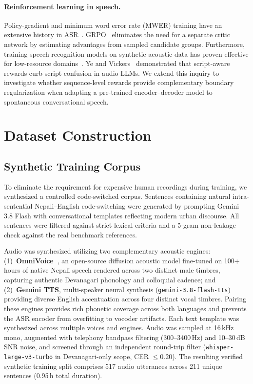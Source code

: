 \documentclass[10pt,twocolumn,a4paper]{article}
\begin{document}
\paragraph{Reinforcement learning in speech.}
Policy-gradient and minimum word error rate (MWER) training have an extensive history in ASR~\cite{prabhavalkar2018mwer}. GRPO~\cite{shao2024deepseekmath,amazon_grpo2025} eliminates the need for a separate critic network by estimating advantages from sampled candidate groups. Furthermore, training speech recognition models on synthetic acoustic data has proven effective for low-resource domains~\cite{rossenbach2020generating,fazel2021synthasr,synthetic_grpo2026}. Ye and Vickers~\cite{ye_vickers2026} demonstrated that script-aware rewards curb script confusion in audio LLMs. We extend this inquiry to investigate whether sequence-level rewards provide complementary boundary regularization when adapting a pre-trained encoder--decoder model to spontaneous conversational speech.

\section{Dataset Construction}

\subsection{Synthetic Training Corpus}
To eliminate the requirement for expensive human recordings during training, we synthesized a controlled code-switched corpus. Sentences containing natural intra-sentential Nepali--English code-switching were generated by prompting Gemini 3.8 Flash with conversational templates reflecting modern urban discourse. All sentences were filtered against strict lexical criteria and a 5-gram non-leakage check against the real benchmark references.

Audio was synthesized utilizing two complementary acoustic engines: (1)~\textbf{OmniVoice~\cite{zhu2026omnivoice}}, an open-source diffusion acoustic model fine-tuned on 100+ hours of native Nepali speech rendered across two distinct male timbres, capturing authentic Devanagari phonology and colloquial cadence; and (2)~\textbf{Gemini TTS}, multi-speaker neural synthesis (\texttt{gemini-3.8-flash-tts}) providing diverse English accentuation across four distinct vocal timbres. Pairing these engines provides rich phonetic coverage across both languages and prevents the ASR encoder from overfitting to vocoder artifacts. Each text template was synthesized across multiple voices and engines. Audio was sampled at 16\,kHz mono, augmented with telephony bandpass filtering (300--3400\,Hz) and 10--30\,dB SNR noise, and screened through an independent round-trip filter (\texttt{whisper-large-v3-turbo} in Devanagari-only scope, CER $\le 0.20$). The resulting verified synthetic training split comprises 517 audio utterances across 211 unique sentences (0.95\,h total duration).
\end{document}
